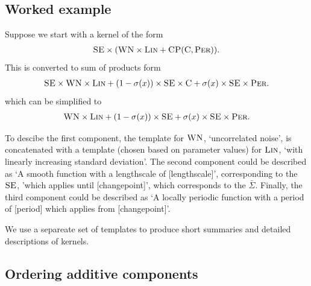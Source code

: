 \documentclass{article}
\def\eg{e.g.\ }
\let\emptyset 0
\begin{document}
\subsection{Worked example}

Suppose we start with a kernel of the form
\begin{align*}
{\textsc{SE}} \times ({\textsc{WN}} \times {\textsc{Lin}} + {\textsc{CP}}({\textsc{C}}, {\textsc{Per}})).
\end{align*}
This is converted to sum of products form
\begin{align*}
{\textsc{SE}} \times {\textsc{WN}} \times {\textsc{Lin}} + (1-\sigma(x)) \times{\textsc{SE}} \times {\textsc{C}} + \sigma(x) \times{\textsc{SE}} \times {\textsc{Per}}.
\end{align*}
which can be simplified to
\begin{align*}
{\textsc{WN}} \times {\textsc{Lin}} + (1-\sigma(x)) \times{\textsc{SE}} + \sigma(x) \times{\textsc{SE}} \times {\textsc{Per}}.
\end{align*}

To descibe the first component, the template for ${\textsc{WN}}$, `uncorrelated noise', is concatenated with a template (chosen based on parameter values) for ${\textsc{Lin}}$, `with linearly increasing standard deviation'.
%
The second component could be described as `A smooth function with a lengthscale of [lengthscale]', corresponding to the ${\textsc{SE}}$, 'which applies until [changepoint]', which corresponds to the $\bar\Sigma$.
%
Finally, the third component could be described as `A locally periodic function with a period of [period] which applies from [changepoint]'.



We use a separeate set of templates to produce short summaries and detailed descriptions of kernels.

\subsection{Ordering additive components}
\end{document}
